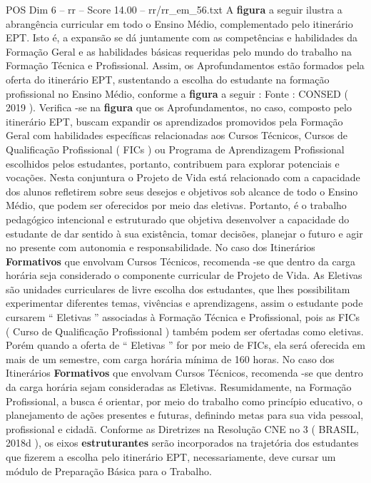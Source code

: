 \begin{textsample}{POS Dim 6 – rr – Score 14.00 – rr/rr\_em\_56.txt}
A \textbf{figura} a seguir ilustra a abrangência curricular em todo o Ensino Médio, complementado pelo itinerário EPT.
Isto é, a expansão se dá juntamente com as competências e habilidades da Formação Geral e as habilidades básicas requeridas pelo mundo do trabalho na Formação Técnica e Profissional.
Assim, os Aprofundamentos estão formados pela oferta do itinerário EPT, sustentando a escolha do estudante na formação profissional no Ensino Médio, conforme a \textbf{figura} a seguir : Fonte : CONSED ( 2019 ).
Verifica -se na \textbf{figura} que os Aprofundamentos, no caso, composto pelo itinerário EPT, buscam expandir os aprendizados promovidos pela Formação Geral com habilidades específicas relacionadas aos Cursos Técnicos, Cursos de Qualificação Profissional ( FICs ) ou Programa de Aprendizagem Profissional escolhidos pelos estudantes, portanto, contribuem para explorar potenciais e vocações.
Nesta conjuntura o Projeto de Vida está relacionado com a capacidade dos alunos refletirem sobre seus desejos e objetivos sob alcance de todo o Ensino Médio, que podem ser oferecidos por meio das eletivas.
Portanto, é o trabalho pedagógico intencional e estruturado que objetiva desenvolver a capacidade do estudante de dar sentido à sua existência, tomar decisões, planejar o futuro e agir no presente com autonomia e responsabilidade.
No caso dos Itinerários \textbf{Formativos} que envolvam Cursos Técnicos, recomenda -se que dentro da carga horária seja considerado o componente curricular de Projeto de Vida.
As Eletivas são unidades curriculares de livre escolha dos estudantes, que lhes possibilitam experimentar diferentes temas, vivências e aprendizagens, assim o estudante pode cursarem “ Eletivas ” associadas à Formação Técnica e Profissional, pois as FICs ( Curso de Qualificação Profissional ) também podem ser ofertadas como eletivas.
Porém quando a oferta de “ Eletivas ” for por meio de FICs, ela será oferecida em mais de um semestre, com carga horária mínima de 160 horas.
No caso dos Itinerários \textbf{Formativos} que envolvam Cursos Técnicos, recomenda -se que dentro da carga horária sejam consideradas as Eletivas.
Resumidamente, na Formação Profissional, a busca é orientar, por meio do trabalho como princípio educativo, o planejamento de ações presentes e futuras, definindo metas para sua vida pessoal, profissional e cidadã.
Conforme as Diretrizes na Resolução CNE no 3 ( BRASIL, 2018d ), os eixos \textbf{estruturantes} serão incorporados na trajetória dos estudantes que fizerem a escolha pelo itinerário EPT, necessariamente, deve cursar um módulo de Preparação Básica para o Trabalho.

\end{textsample}
